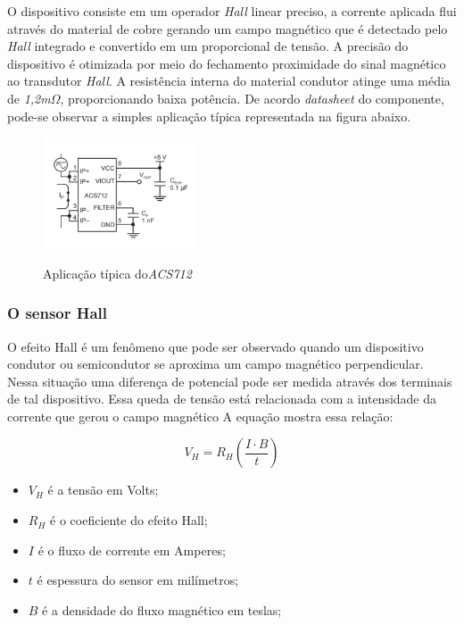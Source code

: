 O dispositivo consiste em um operador \textit{Hall} linear preciso, a corrente aplicada flui através do material de cobre gerando um campo magnético que é detectado pelo \textit{Hall} integrado e convertido em um proporcional de tensão. A precisão do dispositivo é otimizada por meio do fechamento proximidade do sinal magnético ao transdutor \textit{Hall}. A resistência interna do material condutor atinge uma média de \textit{1,2m}$\Omega$, proporcionando baixa potência. De acordo \textit{datasheet} do componente, pode-se observar a simples aplicação típica representada na figura abaixo.
 
\begin{figure}[H]
	\centering
	\caption{Aplicação típica do\textit{ACS712}}
	\includegraphics[width=0.4\textwidth]{figuras/ACS712_typical.png}
	\label{fig:acs712_typical}
\end{figure} 

\subsubsection{O sensor Hall}

O efeito Hall é um fenômeno que pode ser observado quando um dispositivo condutor ou semicondutor se aproxima um campo magnético perpendicular. Nessa situação uma diferença de potencial pode ser medida através dos terminais de tal dispositivo. Essa queda de tensão está relacionada com a intensidade da corrente que gerou o campo magnético \cite{ElectronicsTutorials} A equação mostra essa relação: 

\begin{equation}
V_H = R_H\left ( \frac{I\cdot B}{t} \right)
\end{equation}

\begin{itemize}
	
	\item $V_H$ é a tensão em Volts;
	\item $R_H$ é o coeficiente do efeito Hall;
	\item  $I$ é o fluxo de corrente em Amperes;
	\item $t$ é espessura do sensor em milímetros;
	\item $B$ é a densidade do fluxo magnético em teslas; \ \\
\end{itemize}


